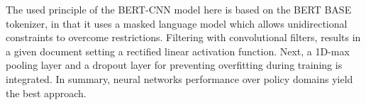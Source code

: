 The used principle of the BERT-CNN model here is based on the BERT BASE tokenizer, in that it uses a masked language model which allows unidirectional constraints to overcome restrictions. Filtering with convolutional filters, results in a given document setting a rectified linear activation function. Next, a 1D-max pooling layer and  a dropout layer for preventing overfitting during training is integrated. In summary, neural networks performance over policy domains yield the best approach.
